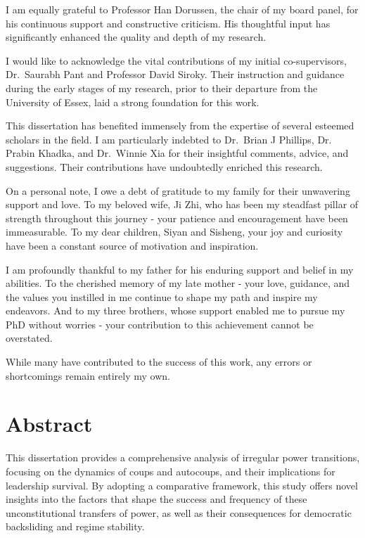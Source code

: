 \documentclass[
  12pt,
]{report}
\begin{document}
I am equally grateful to Professor Han Dorussen, the chair of my board
panel, for his continuous support and constructive criticism. His
thoughtful input has significantly enhanced the quality and depth of my
research.

I would like to acknowledge the vital contributions of my initial
co-supervisors, Dr.~Saurabh Pant and Professor David Siroky. Their
instruction and guidance during the early stages of my research, prior
to their departure from the University of Essex, laid a strong
foundation for this work.

This dissertation has benefited immensely from the expertise of several
esteemed scholars in the field. I am particularly indebted to Dr.~Brian
J Phillips, Dr. Prabin Khadka, and Dr.~Winnie Xia for their insightful
comments, advice, and suggestions. Their contributions have undoubtedly
enriched this research.

On a personal note, I owe a debt of gratitude to my family for their
unwavering support and love. To my beloved wife, Ji Zhi, who has been my
steadfast pillar of strength throughout this journey - your patience and
encouragement have been immeasurable. To my dear children, Siyan and
Sisheng, your joy and curiosity have been a constant source of
motivation and inspiration.

I am profoundly thankful to my father for his enduring support and
belief in my abilities. To the cherished memory of my late mother - your
love, guidance, and the values you instilled in me continue to shape my
path and inspire my endeavors. And to my three brothers, whose support
enabled me to pursue my PhD without worries - your contribution to this
achievement cannot be overstated.

While many have contributed to the success of this work, any errors or
shortcomings remain entirely my own.

\chapter*{Abstract}\label{abstract}

This dissertation provides a comprehensive analysis of irregular power
transitions, focusing on the dynamics of coups and autocoups, and their
implications for leadership survival. By adopting a comparative
framework, this study offers novel insights into the factors that shape
the success and frequency of these unconstitutional transfers of power,
as well as their consequences for democratic backsliding and regime
stability.
\end{document}
